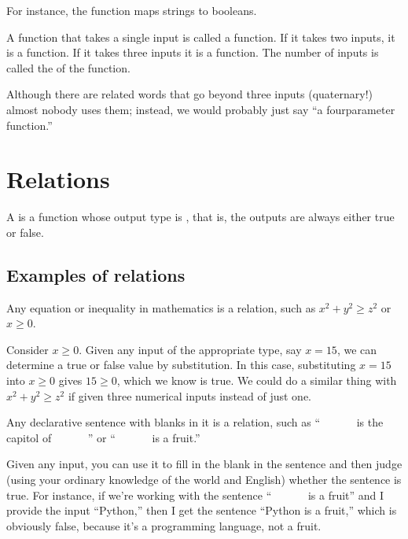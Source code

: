 \documentclass[letterpaper,10pt,english]{sphinxmanual}
\begin{document}
For instance, the  function maps strings to booleans.

 A function that takes a single input is called a  function.  If it takes two inputs, it is a  function.  If it takes three inputs it is a  function.  The number of inputs is called the  of the function.

Although there are related words that go beyond three inputs (quaternary!) almost nobody uses them; instead, we would probably just say “a four\sphinxhyphen{}parameter function.”


\section{Relations}
\label{\detokenize{chapter-2-mathematical-foundations:relations}}
 A  is a function whose output type is , that is, the outputs are always either true or false.


\subsection{Examples of relations}
\label{\detokenize{chapter-2-mathematical-foundations:examples-of-relations}}
 Any equation or inequality in mathematics is a relation, such as \(x^2+y^2\ge z^2\) or \(x\ge 0\).

Consider \(x\ge 0\).  Given any input of the appropriate type, say \(x=15\), we can determine a true or false value by substitution.  In this case, substituting \(x=15\) into \(x\ge0\) gives \(15\ge0\), which we know is true.  We could do a similar thing with \(x^2+y^2\ge z^2\) if given three numerical inputs instead of just one.

 Any declarative sentence with blanks in it is a relation, such as “        is the capitol of        ” or “        is a fruit.”

Given any input, you can use it to fill in the blank in the sentence and then judge (using your ordinary knowledge of the world and English) whether the sentence is true.  For instance, if we’re working with the sentence “        is a fruit” and I provide the input “Python,” then I get the sentence “Python is a fruit,” which is obviously false, because it’s a programming language, not a fruit.
\end{document}
